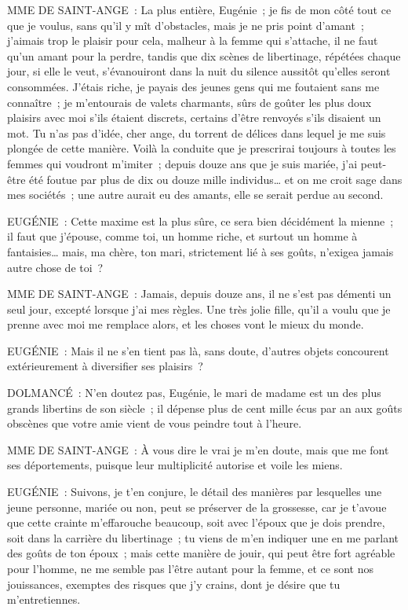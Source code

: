 \documentclass[french,twoside]{book} %
\begin{document}
MME DE SAINT-ANGE : La plus entière, Eugénie ; je fis de mon côté tout ce que je voulus, sans qu’il y mît d’obstacles, mais je ne pris point d’amant ; j’aimais trop le plaisir pour cela, malheur à la femme qui s’attache, il ne faut qu’un amant pour la perdre, tandis que dix scènes de libertinage, répétées chaque jour, si elle le veut, s’évanouiront dans la nuit du silence aussitôt qu’elles seront consommées. J’étais riche, je payais des jeunes gens qui me foutaient sans me connaître ; je m’entourais de valets charmants, sûrs de goûter les plus doux plaisirs avec moi s’ils étaient discrets, certains d’être renvoyés s’ils disaient un mot. Tu n’as pas d’idée, cher ange, du torrent de délices dans lequel je me suis plongée de cette manière. Voilà la conduite que je prescrirai toujours à toutes les femmes qui voudront m’imiter ; depuis douze ans que je suis mariée, j’ai peut-être été foutue par plus de dix ou douze mille individus… et on me croit sage dans mes sociétés ; une autre aurait eu des amants, elle se serait perdue au second.\par
EUGÉNIE : Cette maxime est la plus sûre, ce sera bien décidément la mienne ; il faut que j’épouse, comme toi, un homme riche, et surtout un homme à fantaisies… mais, ma chère, ton mari, strictement lié à ses goûts, n’exigea jamais autre chose de toi ?\par
MME DE SAINT-ANGE : Jamais, depuis douze ans, il ne s’est pas démenti un seul jour, excepté lorsque j’ai mes règles. Une très jolie fille, qu’il a voulu que je prenne avec moi me remplace alors, et les choses vont le mieux du monde.\par
EUGÉNIE : Mais il ne s’en tient pas là, sans doute, d’autres objets concourent extérieurement à diversifier ses plaisirs ?\par
DOLMANCÉ : N’en doutez pas, Eugénie, le mari de madame est un des plus grands libertins de son siècle ; il dépense plus de cent mille écus par an aux goûts obscènes que votre amie vient de vous peindre tout à l’heure.\par
MME DE SAINT-ANGE : À vous dire le vrai je m’en doute, mais que me font ses déportements, puisque leur multiplicité autorise et voile les miens.\par
EUGÉNIE : Suivons, je t’en conjure, le détail des manières par lesquelles une jeune personne, mariée ou non, peut se préserver de la grossesse, car je t’avoue que cette crainte m’effarouche beaucoup, soit avec l’époux que je dois prendre, soit dans la carrière du libertinage ; tu viens de m’en indiquer une en me parlant des goûts de ton époux ; mais cette manière de jouir, qui peut être fort agréable pour l’homme, ne me semble pas l’être autant pour la femme, et ce sont nos jouissances, exemptes des risques que j’y crains, dont je désire que tu m’entretiennes.\par
\end{document}
